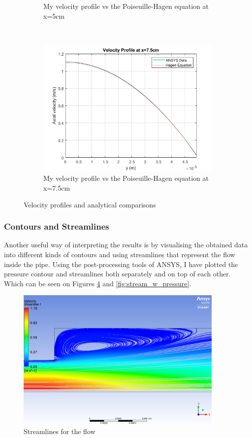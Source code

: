 \begin{figure}[H]
\begin{subfigure}{.45\textwidth}
  \caption{My velocity profile vs the Poiseuille-Hagen equation at x=5cm}
  \label{fig:matlab_hagen}
\end{subfigure}
~
\begin{subfigure}{.45\textwidth}
  \centering
  \includegraphics[width=.9\linewidth]{images/task1/hagen75_1.png}
  \caption{My velocity profile vs the Poiseuille-Hagen equation at x=7.5cm}
  \label{fig:matlab_hagen2}
\end{subfigure}
\caption{Velocity profiles and analytical comparisons}
\label{fig:vel_profiles_hagen}
\end{figure}

\subsubsection{Contours and Streamlines}
Another useful way of interpreting the results is by visualising the obtained data into different kinds of contours and using streamlines that represent the flow inside the pipe. Using the post-processing tools of ANSYS, I have plotted the pressure contour and streamlines both separately and on top of each other. Which can be seen on Figures \ref{fig:stream} and \ref{fig:stream_w_pressure}.

\begin{figure}[H]
    \centering
    \includegraphics[width=0.9\textwidth]{images/task1/streamlines.png}
    \caption{Streamlines for the flow}
    \label{fig:stream}
\end{figure}


